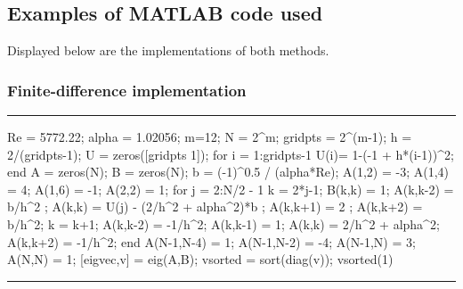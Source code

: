 \documentclass[a4paper, 12pt, twoside, openright]{article}
\numberwithin{equation}{section}
\begin{document}
\subsection{Examples of MATLAB code used}
Displayed below are the implementations of both methods.
\subsubsection{Finite-difference implementation}
\begin{center}
\rule{\linewidth}{1.5pt}
\end{center}
\begin{spverbatim}
Re = 5772.22; %
alpha = 1.02056; %
m=12;
N = 2^m;
gridpts = 2^(m-1); %
h = 2/(gridpts-1);  
U = zeros([gridpts 1]);
for i = 1:gridpts-1
    U(i)= 1-(-1 + h*(i-1))^2;
end
A = zeros(N);
B = zeros(N);
b = (-1)^0.5 / (alpha*Re);
A(1,2) = -3;
A(1,4) = 4;
A(1,6) = -1;
A(2,2) = 1;
for j = 2:N/2 - 1
    k = 2*j-1;
    B(k,k) = 1;
    A(k,k-2) = b/h^2 ; %
    A(k,k) = U(j) - (2/h^2 + alpha^2)*b ; %
    A(k,k+1) = 2 ; %
    A(k,k+2) = b/h^2; %
    k = k+1;
    A(k,k-2) = -1/h^2;
    A(k,k-1) = 1;
    A(k,k) = 2/h^2 + alpha^2; 
    A(k,k+2) = -1/h^2;
end
A(N-1,N-4) = 1;
A(N-1,N-2) = -4;
A(N-1,N) = 3;
A(N,N) = 1;
[eigvec,v] = eig(A,B); 
vsorted = sort(diag(v));
vsorted(1) %
\end{spverbatim}
\begin{center}
\rule{\linewidth}{1.5pt}
\end{center}
\end{document}
